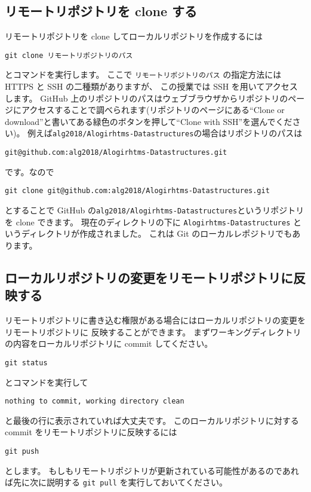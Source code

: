 \documentclass[a4paper,11pt, article]{memoir}
\begin{document}
\subsection{リモートリポジトリを clone する}
リモートリポジトリを clone してローカルリポジトリを作成するには
\begin{verbatim}
git clone リモートリポジトリのパス
\end{verbatim}
とコマンドを実行します。
ここで \verb|リモートリポジトリのパス| の指定方法には HTTPS と SSH の二種類がありますが、
この授業では SSH を用いてアクセスします。
GitHub 上のリポジトリのパスはウェブブラウザからリポジトリのページにアクセスすることで調べられます(リポジトリのページにある``Clone or download''と書いてある緑色のボタンを押して``Clone with SSH''を選んでください)。
例えば\texttt{alg2018/Alogirhtms-Datastructures}の場合はリポジトリのパスは
\begin{verbatim}
git@github.com:alg2018/Alogirhtms-Datastructures.git
\end{verbatim}
です。なので
\begin{verbatim}
git clone git@github.com:alg2018/Alogirhtms-Datastructures.git
\end{verbatim}
とすることで GitHub の\texttt{alg2018/Alogirhtms-Datastructures}というリポジトリを clone できます。
現在のディレクトリの下に \texttt{Alogirhtms-Datastructures} というディレクトリが作成されました。
これは Git のローカルレポジトリでもあります。

\subsection{ローカルリポジトリの変更をリモートリポジトリに反映する}
リモートリポジトリに書き込む権限がある場合にはローカルリポジトリの変更をリモートリポジトリに
反映することができます。
まずワーキングディレクトリの内容をローカルリポジトリに commit してください。
\begin{verbatim}
git status
\end{verbatim}
とコマンドを実行して
\begin{verbatim}
nothing to commit, working directory clean
\end{verbatim}
と最後の行に表示されていれば大丈夫です。
このローカルリポジトリに対する commit をリモートリポジトリに反映するには
\begin{verbatim}
git push
\end{verbatim}
とします。
もしもリモートリポジトリが更新されている可能性があるのであれば先に次に説明する \texttt{git pull} を実行しておいてください。
\end{document}
